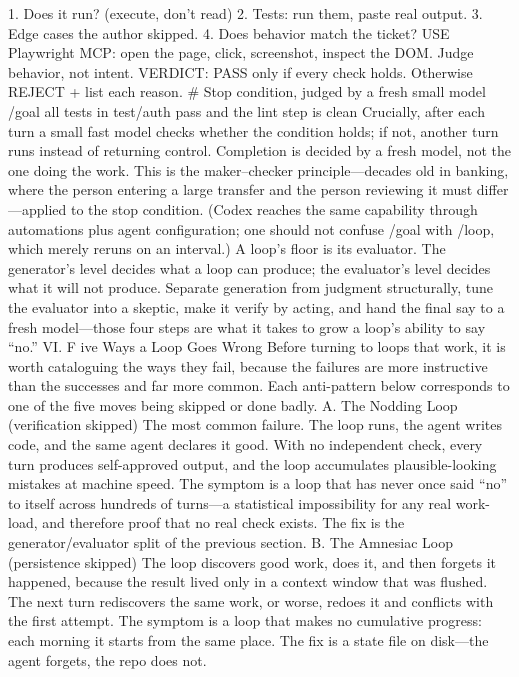\documentclass[conference]{IEEEtran}
\begin{document}
1. Does it run? (execute, don’t read)
2. Tests: run them, paste real output.
3. Edge cases the author skipped.
4. Does behavior match the ticket?
USE Playwright MCP: open the page, click,
screenshot, inspect the DOM. Judge behavior,
not intent.
VERDICT: PASS only if every check holds.
Otherwise REJECT + list each reason.
\# Stop condition, judged by a fresh small model
/goal all tests in test/auth pass and the lint
step is clean
Crucially, after each turn a small fast model checks whether the
condition holds; if not, another turn runs instead of returning
control. Completion is decided by a fresh model, not the one
doing the work. This is the maker–checker principle—decades
old in banking, where the person entering a large transfer and the
person reviewing it must differ—applied to the stop condition.
(Codex reaches the same capability through automations plus
agent configuration; one should not confuse /goal with /loop,
which merely reruns on an interval.)
A loop’s floor is its evaluator. The generator’s level decides
what a loop can produce; the evaluator’s level decides what it
will not produce. Separate generation from judgment structurally,
tune the evaluator into a skeptic, make it verify by acting, and
hand the final say to a fresh model—those four steps are what it
takes to grow a loop’s ability to say “no.”
VI. F ive Ways a Loop Goes Wrong
Before turning to loops that work, it is worth cataloguing the
ways they fail, because the failures are more instructive than
the successes and far more common. Each anti-pattern below
corresponds to one of the five moves being skipped or done
badly.
A. The Nodding Loop (verification skipped)
The most common failure. The loop runs, the agent writes
code, and the same agent declares it good. With no independent
check, every turn produces self-approved output, and the loop
accumulates plausible-looking mistakes at machine speed. The
symptom is a loop that has never once said “no” to itself across
hundreds of turns—a statistical impossibility for any real work-
load, and therefore proof that no real check exists. The fix is the
generator/evaluator split of the previous section.
B. The Amnesiac Loop (persistence skipped)
The loop discovers good work, does it, and then forgets it
happened, because the result lived only in a context window that
was flushed. The next turn rediscovers the same work, or worse,
redoes it and conflicts with the first attempt. The symptom is a
loop that makes no cumulative progress: each morning it starts
from the same place. The fix is a state file on disk—the agent
forgets, the repo does not.
\end{document}
